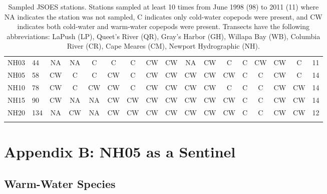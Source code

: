 \documentclass[preprint, authoryear, 12pt]{elsarticle}
\begin{document}
{\begin{longtable}{llccccccccccccccr}
        NH03 & 44  & NA & NA & C & C & C & CW & CW & NA & CW & C & C & CW & CW & C & 11 \\
        NH05 & 58  & CW & C & C & CW & C & CW & CW & CW & CW & CW & C & C & CW & C & 14 \\
        NH10 & 78 & CW & C & CW & CW & C & CW & CW & CW & CW & C & C & C & CW & CW & 14 \\
        NH15 & 90 & CW & NA & NA & CW & CW & CW & CW & CW & CW & CW & C & C & CW & CW & 14 \\
        NH20 & 134 & NA & CW & NA & CW & CW & CW & CW & CW & CW & CW & C & C & CW & CW & 12 \\
    \hline
    \caption{Sampled JSOES stations. Stations sampled at least 10 times from June 1998 (98) to 2011 (11) where NA indicates the station was not sampled, C indicates only cold-water copepods were present, and CW indicates both cold-water and warm-water copepods were present. Transects have the following abbreviations: LaPush (LP), Queet's River (QR), Gray's Harbor (GH), Willapa Bay (WB), Columbia River (CR), Cape Meares (CM), Newport Hydrographic (NH).} %
\end{longtable}}







\clearpage
\hypertarget{appendixB}{\section*{Appendix B: NH05 as a Sentinel}}
\renewcommand{\thesubsection}{B.1}
\setcounter{figure}{0} 
\renewcommand{\thefigure}{\small B.\arabic{figure}}
\setcounter{table}{0} 
\renewcommand{\thetable}{\small B.\arabic{table}}
\subsection{Warm-Water Species}
\end{document}
